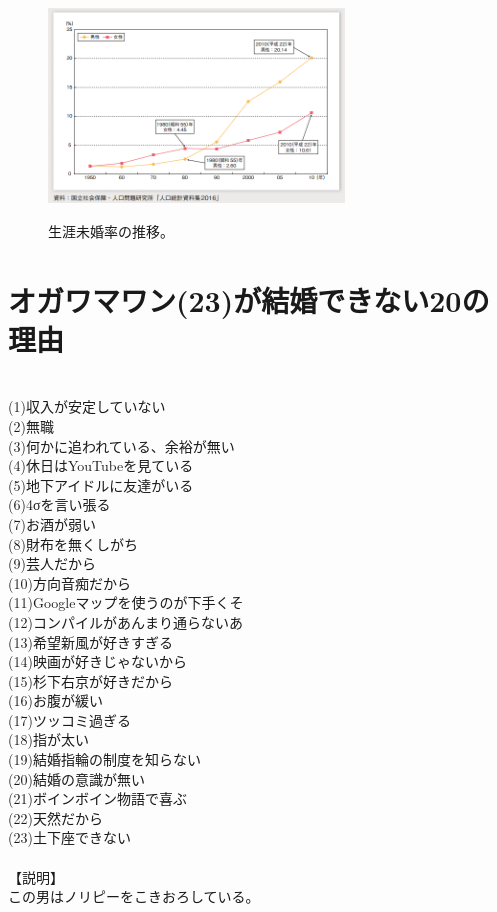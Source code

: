 \begin{figure}[htbp]
\begin{center}
\includegraphics[width=0.7\textwidth]{./section/OgawaManYoushu/figures/MikonRitsu.png}
  \label{fig:Mikon}
  \caption{生涯未婚率の推移。}
\end{center}
\end{figure}



\section{オガワマワン(23)が結婚できない20の理由}
　\\
(1)収入が安定していない\\
(2)無職\\
(3)何かに追われている、余裕が無い\\
(4)休日はYouTubeを見ている\\
(5)地下アイドルに友達がいる\\
(6)4σを言い張る\\
(7)お酒が弱い\\
(8)財布を無くしがち\\
(9)芸人だから\\
(10)方向音痴だから\\
(11)Googleマップを使うのが下手くそ\\
(12)コンパイルがあんまり通らないあ\\
(13)希望新風が好きすぎる\\
(14)映画が好きじゃないから\\
(15)杉下右京が好きだから\\
(16)お腹が緩い\\
(17)ツッコミ過ぎる\\
(18)指が太い\\
(19)結婚指輪の制度を知らない\\
(20)結婚の意識が無い\\
(21)ボインボイン物語で喜ぶ\\
(22)天然だから\\
(23)土下座できない\\
\\
【説明】\\
この男はノリピーをこきおろしている。\\

